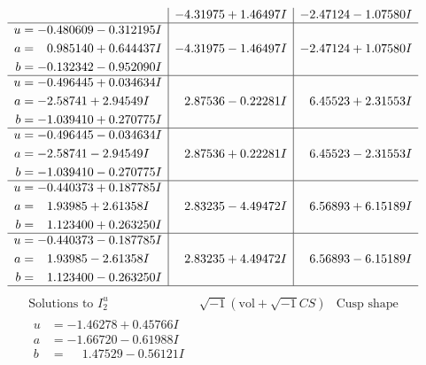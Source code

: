 \documentclass[1p]{elsarticle_modified}
\theoremstyle{definition}
\newcommand{\I}{\sqrt{-1}}
\begin{document}
$$\begin{array}{c|c|c}
 & -4.31975 + 1.46497 I & -2.47124 - 1.07580 I \\ \hline\begin{aligned}
u &= -0.480609 - 0.312195 I \\
a &= \phantom{-}0.985140 + 0.644437 I \\
b &= -0.132342 - 0.952090 I\end{aligned}
 & -4.31975 - 1.46497 I & -2.47124 + 1.07580 I \\ \hline\begin{aligned}
u &= -0.496445 + 0.034634 I \\
a &= -2.58741 + 2.94549 I \\
b &= -1.039410 + 0.270775 I\end{aligned}
 & \phantom{-}2.87536 - 0.22281 I & \phantom{-}6.45523 + 2.31553 I \\ \hline\begin{aligned}
u &= -0.496445 - 0.034634 I \\
a &= -2.58741 - 2.94549 I \\
b &= -1.039410 - 0.270775 I\end{aligned}
 & \phantom{-}2.87536 + 0.22281 I & \phantom{-}6.45523 - 2.31553 I \\ \hline\begin{aligned}
u &= -0.440373 + 0.187785 I \\
a &= \phantom{-}1.93985 + 2.61358 I \\
b &= \phantom{-}1.123400 + 0.263250 I\end{aligned}
 & \phantom{-}2.83235 - 4.49472 I & \phantom{-}6.56893 + 6.15189 I \\ \hline\begin{aligned}
u &= -0.440373 - 0.187785 I \\
a &= \phantom{-}1.93985 - 2.61358 I \\
b &= \phantom{-}1.123400 - 0.263250 I\end{aligned}
 & \phantom{-}2.83235 + 4.49472 I & \phantom{-}6.56893 - 6.15189 I\\
 \hline 
 \end{array}$$\newpage$$\begin{array}{c|c|c}  
\text{Solutions to }I^u_{2}& \I (\text{vol} + \sqrt{-1}CS) & \text{Cusp shape}\\
 \hline 
\begin{aligned}
u &= -1.46278 + 0.45766 I \\
a &= -1.66720 - 0.61988 I \\
b &= \phantom{-}1.47529 - 0.56121 I\end{aligned}

\end{array}$$
\end{document}
